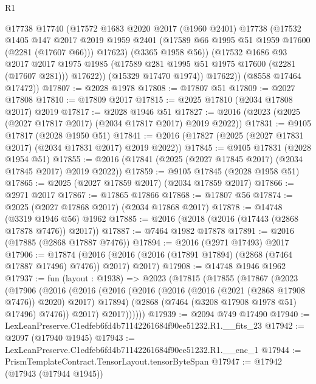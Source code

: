 \begin{lexlean}{R1}
\begin{coremodule}
              @17738
              @17740
              (@17572
                @1683
                @2020
                @2017
                (@1960 @2401)
                @17738
                (@17532
                  @1405
                  @147
                  @2017
                  @2019
                  @1959
                  @2401
                  (@17589 @66 @1995 @51 @1959 @17600 (@2281 (@17607 @66)))
                  @17623)
                (@3365 @1958 @56))
              (@17532
                @1686
                @93
                @2017
                @2017
                @1975
                @1985
                (@17589 @281 @1995 @51 @1975 @17600 (@2281 (@17607 @281)))
                @17622))
            (@15329 @17470 @1974))
          @17622))
      (@8558 @17464 @17472))
@17807 := @2028 @1978
@17808 := @17807 @51
@17809 := @2027 @17808
@17810 := @17809 @2017
@17815 := @2025 @17810 (@2034 @17808 @2017) @2019
@17817 := @2028 @1946 @51
@17827 := @2016 (@2023 (@2025 (@2027 @17817 @2017) (@2034 @17817 @2017) @2019 @2022))
@17831 := @9105 @17817 (@2028 @1950 @51)
@17841 := @2016 (@17827 (@2025 (@2027 @17831 @2017) (@2034 @17831 @2017) @2019 @2022))
@17845 := @9105 @17831 (@2028 @1954 @51)
@17855 := @2016 (@17841 (@2025 (@2027 @17845 @2017) (@2034 @17845 @2017) @2019 @2022))
@17859 := @9105 @17845 (@2028 @1958 @51)
@17865 := @2025 (@2027 @17859 @2017) (@2034 @17859 @2017)
@17866 := @2971 @2017
@17867 := @17865 @17866
@17868 := @17807 @56
@17874 := @2025 (@2027 @17868 @2017) (@2034 @17868 @2017)
@17878 := @14748 (@3319 @1946 @56) @1962
@17885 := @2016 (@2018 (@2016 (@17443 (@2868 @17878 @7476)) @2017))
@17887 := @7464 @1982 @17878
@17891 := @2016 (@17885 (@2868 @17887 @7476))
@17894 := @2016 (@2971 @17493) @2017
@17906 := @17874
    (@2016 (@2016 (@2016 (@17891 @17894) (@2868 (@7464 @17887 @17496) @7476)) @2017) @2017)
@17908 := @14748 @1946 @1962
@17937 := fun (layout : @1938) =>
  @2023
    (@17815
      (@17855
        (@17867
          (@2023
            (@17906
              (@2016
                (@2016
                  (@2016
                    (@2016 (@2016 (@2016 (@2021 (@2868 @17908 @7476)) @2020) @2017) @17894)
                    (@2868 (@7464 (@3208 @17908 @1978 @51) @17496) @7476))
                  @2017)
                @2017))))))
@17939 := @2094 @749 @17490
@17940 := LexLeanPreserve.C1edfeb6fd4b71142261684f90ee51232.R1.__fits_23
@17942 := @2097 (@17940 @1945)
@17943 := LexLeanPreserve.C1edfeb6fd4b71142261684f90ee51232.R1.__enc_1
@17944 := PrismTemplateContract.TensorLayout.tensorByteSpan
@17947 := @17942 (@17943 (@17944 @1945))

\end{coremodule}
\end{lexlean}
